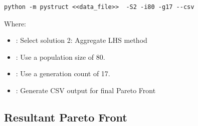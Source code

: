 \begin{verbatim}
python -m pystruct <<data_file>>  -S2 -i80 -g17 --csv
\end{verbatim}

\noindent Where: 

\begin{itemize}
  \item {}: Select solution 2: Aggregate LHS method
  \item {}: Use a population size of 80. 
  \item {}: Use a generation count of 17. 
  \item {}: Generate CSV output for final Pareto Front
\end{itemize}

\subsection{Resultant Pareto Front}
